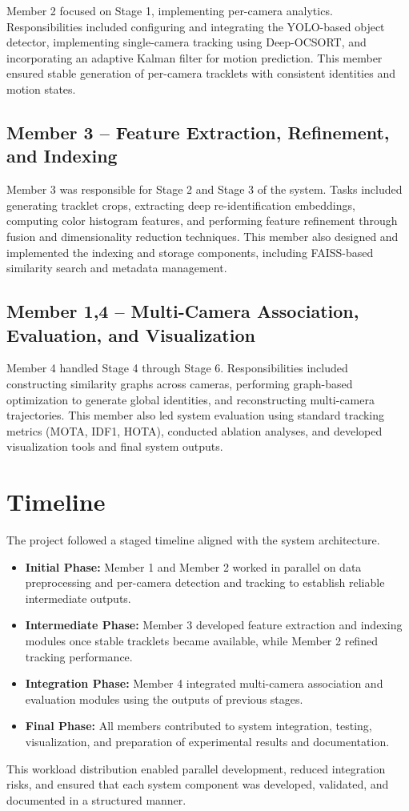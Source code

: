 Member 2 focused on Stage 1, implementing per-camera analytics. Responsibilities included configuring and integrating the YOLO-based object detector, implementing single-camera tracking using Deep-OCSORT, and incorporating an adaptive Kalman filter for motion prediction. This member ensured stable generation of per-camera tracklets with consistent identities and motion states.

\subsection*{Member 3 – Feature Extraction, Refinement, and Indexing}

Member 3 was responsible for Stage 2 and Stage 3 of the system. Tasks included generating tracklet crops, extracting deep re-identification embeddings, computing color histogram features, and performing feature refinement through fusion and dimensionality reduction techniques. This member also designed and implemented the indexing and storage components, including FAISS-based similarity search and metadata management.

\subsection*{Member 1,4 – Multi-Camera Association, Evaluation, and Visualization}

Member 4 handled Stage 4 through Stage 6. Responsibilities included constructing similarity graphs across cameras, performing graph-based optimization to generate global identities, and reconstructing multi-camera trajectories. This member also led system evaluation using standard tracking metrics (MOTA, IDF1, HOTA), conducted ablation analyses, and developed visualization tools and final system outputs.

\section{Timeline}

The project followed a staged timeline aligned with the system architecture.

\begin{itemize}
    \item \textbf{Initial Phase:} Member 1 and Member 2 worked in parallel on data preprocessing and per-camera detection and tracking to establish reliable intermediate outputs.
    \item \textbf{Intermediate Phase:} Member 3 developed feature extraction and indexing modules once stable tracklets became available, while Member 2 refined tracking performance.
    \item \textbf{Integration Phase:} Member 4 integrated multi-camera association and evaluation modules using the outputs of previous stages.
    \item \textbf{Final Phase:} All members contributed to system integration, testing, visualization, and preparation of experimental results and documentation.
\end{itemize}

This workload distribution enabled parallel development, reduced integration risks, and ensured that each system component was developed, validated, and documented in a structured manner.
